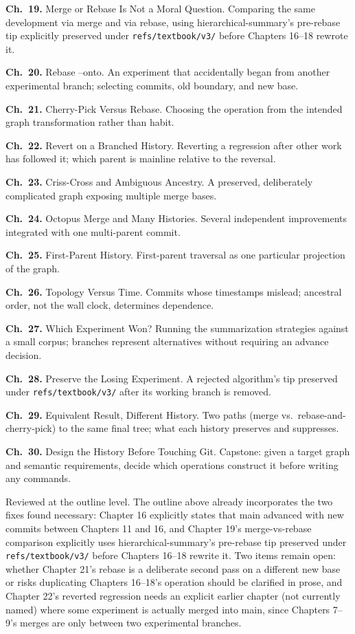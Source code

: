 \documentclass[11pt]{book}
\newcommand{\subheading}[1]{\bigskip\noindent{\bfseries\itshape #1}\smallskip\par}
\newcommand{\chapentry}[2]{\noindent\textbf{Ch.~#1.} #2\par\smallskip}
\begin{document}
\chapentry{19}{Merge or Rebase Is Not a Moral Question. Comparing the same development via merge and via rebase, using hierarchical-summary's pre-rebase tip explicitly preserved under \texttt{refs/textbook/v3/} before Chapters 16--18 rewrote it.}
\chapentry{20}{Rebase --onto. An experiment that accidentally began from another experimental branch; selecting commits, old boundary, and new base.}
\chapentry{21}{Cherry-Pick Versus Rebase. Choosing the operation from the intended graph transformation rather than habit.}
\chapentry{22}{Revert on a Branched History. Reverting a regression after other work has followed it; which parent is mainline relative to the reversal.}
\chapentry{23}{Criss-Cross and Ambiguous Ancestry. A preserved, deliberately complicated graph exposing multiple merge bases.}
\chapentry{24}{Octopus Merge and Many Histories. Several independent improvements integrated with one multi-parent commit.}
\chapentry{25}{First-Parent History. First-parent traversal as one particular projection of the graph.}
\chapentry{26}{Topology Versus Time. Commits whose timestamps mislead; ancestral order, not the wall clock, determines dependence.}
\chapentry{27}{Which Experiment Won? Running the summarization strategies against a small corpus; branches represent alternatives without requiring an advance decision.}
\chapentry{28}{Preserve the Losing Experiment. A rejected algorithm's tip preserved under \texttt{refs/textbook/v3/} after its working branch is removed.}
\chapentry{29}{Equivalent Result, Different History. Two paths (merge vs.\ rebase-and-cherry-pick) to the same final tree; what each history preserves and suppresses.}
\chapentry{30}{Design the History Before Touching Git. Capstone: given a target graph and semantic requirements, decide which operations construct it before writing any commands.}

\subheading{Status and Open Items}
Reviewed at the outline level. The outline above already incorporates the two fixes found necessary: Chapter 16 explicitly states that main advanced with new commits between Chapters 11 and 16, and Chapter 19's merge-vs-rebase comparison explicitly uses hierarchical-summary's pre-rebase tip preserved under \texttt{refs/textbook/v3/} before Chapters 16--18 rewrite it. Two items remain open: whether Chapter 21's rebase is a deliberate second pass on a different new base or risks duplicating Chapters 16--18's operation should be clarified in prose, and Chapter 22's reverted regression needs an explicit earlier chapter (not currently named) where some experiment is actually merged into main, since Chapters 7--9's merges are only between two experimental branches.
\end{document}

